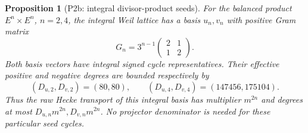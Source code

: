 \documentclass[11pt,a4paper]{article}
\newtheorem{proposition}[theorem]{Proposition}
\theoremstyle{definition}\newtheorem{definition}[theorem]{Definition}
\theoremstyle{remark}\newtheorem{remark}[theorem]{Remark}
\begin{document}
\begin{proposition}[P2b: integral divisor-product seeds]\label{P2b}
For the balanced product $E^n\times E^n$, $n=2,4$, the integral Weil lattice has a basis $u_n,v_n$ with positive Gram matrix
\begin{equation}\label{eq:WeilGram}
 G_n=3^{n-1}\begin{pmatrix}2&1\\1&2\end{pmatrix}.
\end{equation}
Both basis vectors have integral signed cycle representatives. Their effective positive and negative degrees are bounded respectively by
\[
 (D_{u,2},D_{v,2})=(80,80),\qquad
 (D_{u,4},D_{v,4})=(147456,175104).
\]
Thus the raw Hecke transport of this integral basis has multiplier $m^{2n}$ and degrees at most $D_{u,n}m^{2n},D_{v,n}m^{2n}$. No projector denominator is needed for these particular seed cycles.
\end{proposition}
\end{document}
